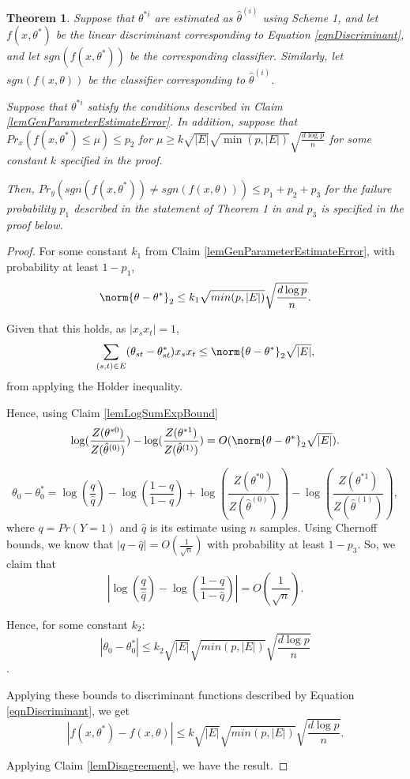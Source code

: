 \documentclass{article}
\newtheorem{theorem}{Theorem}
\def\edge{\ensuremath{E}}
\def\thetaEst{\hat{\theta}}
\begin{document}
\begin{theorem}
\label{thmMarginAnalysisGenerative}
 Suppose that $\theta^{*i}$ are estimated as $\thetaEst^{(i)}$ using Scheme 1, and let $f(x, \theta^*)$ be the linear discriminant corresponding to Equation \ref{eqnDiscriminant}, and let $sgn(f(x, \theta^*))$ be the corresponding classifier. Similarly, let $sgn(f(x, \theta))$ be the classifier corresponding to $\thetaEst^{(i)}$.

Suppose that $\theta^{*i}$ satisfy the conditions described in Claim \ref{lemGenParameterEstimateError}. In addition, suppose that $Pr_x(f(x, \theta^*) \leq \mu) \leq p_2$ for $\mu \geq k \sqrt{|\edge|} \sqrt{\min(p, |\edge|)}\sqrt{\frac{d \log p}{n}}$ for some constant $k$ specified in the proof.

Then, $Pr_y(sgn(f(x, \theta^*)) \neq sgn(f(x, \theta))) \leq p_1 + p_2 + p_3$ for the failure probability $p_1$ described in the statement of Theorem 1 in \cite{RWLIsing} and $p_3$ is specified in the proof below.
\end{theorem}
\begin{proof}
For some constant $k_1$ from Claim \ref{lemGenParameterEstimateError}, with probability at least $1-p_1$,
$$\norm{\theta - \theta^*}_2 \leq k_1 \sqrt{min(p, |\edge|)}\sqrt{\frac{d \log p}{n}}.$$

Given that this holds, as $|x_s x_t| = 1$, 
$$\sum_{(s, t) \in E}(\theta_{st} - \theta_{st}^*) x_s x_t \leq \norm{\theta - \theta^*}_2 \sqrt{|E|},$$ from applying the Holder inequality.

Hence, using Claim \ref{lemLogSumExpBound} $$\log(\frac{Z(\theta^{*0})}{Z(\thetaEst^{(0)})}) - \log(\frac{Z(\theta^{*1})}{Z(\thetaEst^{(1)})}) = O(\norm{\theta - \theta^*}_2 \sqrt{|E|}).$$

$$\theta_0 - \theta_0^* = \log(\frac{q}{\hat{q}}) - \log(\frac{1-q}{1-\hat{q}}) + \log(\frac{Z(\theta^{*0})}{Z(\thetaEst^{(0)})}) - \log(\frac{Z(\theta^{*1})}{Z(\thetaEst^{(1)})}),$$
where $q = Pr(Y=1)$ and $\hat{q}$ is its estimate using $n$ samples. Using Chernoff bounds, we know that $|q - \hat{q}| = O(\frac{1}{\sqrt{n}})$ with probability at least $1-p_3$. So, we claim that $$|\log(\frac{q}{\hat{q}}) - \log(\frac{1-q}{1-\hat{q}})| = O(\frac{1}{\sqrt{n}}).$$

Hence,  for some constant $k_2$:
$$|\theta_0 - \theta_0^*| \leq k_2 \sqrt{|E|}\sqrt{min(p, |\edge|)}\sqrt{\frac{d \log p}{n}}$$.

Applying these bounds to discriminant functions described by Equation \ref{eqnDiscriminant}, we get 
$$|f(x, \theta^*) - f(x, \theta)| \leq k \sqrt{|\edge|} \sqrt{min(p, |\edge|)}\sqrt{\frac{d \log p}{n}}.$$

Applying Claim \ref{lemDisagreement}, we have the result.
\end{proof}
\end{document}
